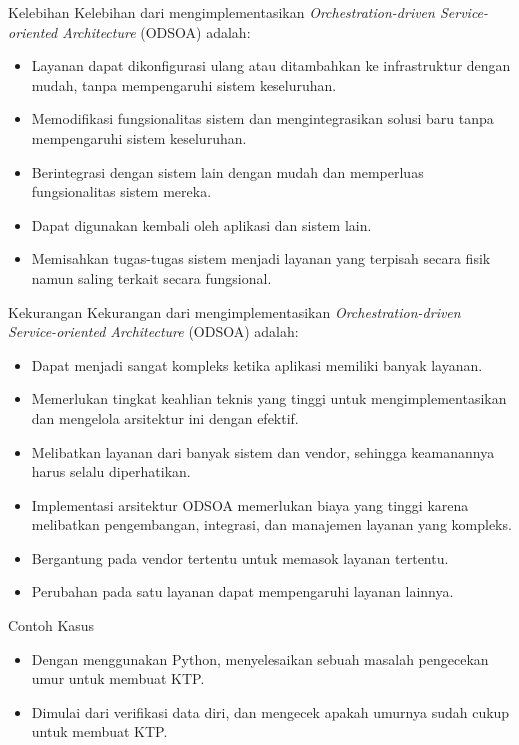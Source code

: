 \documentclass{beamer}
\begin{document}
	\begin{frame}{Kelebihan}
		Kelebihan dari mengimplementasikan \textit{Orchestration-driven Service-oriented Architecture} (ODSOA) adalah:
		\begin{itemize}
			\item Layanan dapat dikonfigurasi ulang atau ditambahkan ke infrastruktur dengan mudah, tanpa mempengaruhi sistem keseluruhan.
			\item Memodifikasi fungsionalitas sistem dan mengintegrasikan solusi baru tanpa mempengaruhi sistem keseluruhan.
			\item Berintegrasi dengan sistem lain dengan mudah dan memperluas fungsionalitas sistem mereka.
			\item Dapat digunakan kembali oleh aplikasi dan sistem lain.
			\item Memisahkan tugas-tugas sistem menjadi layanan yang terpisah secara fisik namun saling terkait secara fungsional.
			
		\end{itemize}
	\end{frame}
	
	\begin{frame}{Kekurangan}
		Kekurangan dari mengimplementasikan \textit{Orchestration-driven Service-oriented Architecture} (ODSOA) adalah:
		\begin{itemize}
			\item Dapat menjadi sangat kompleks ketika aplikasi memiliki banyak layanan.
			\item Memerlukan tingkat keahlian teknis yang tinggi untuk mengimplementasikan dan mengelola arsitektur ini dengan efektif.
			\item Melibatkan layanan dari banyak sistem dan vendor, sehingga keamanannya harus selalu diperhatikan.
			\item Implementasi arsitektur ODSOA memerlukan biaya yang tinggi karena melibatkan pengembangan, integrasi, dan manajemen layanan yang kompleks.
			\item Bergantung pada vendor tertentu untuk memasok layanan tertentu.
			\item Perubahan pada satu layanan dapat mempengaruhi layanan lainnya.
		\end{itemize}
	\end{frame}
	
	\begin{frame}{Contoh Kasus}
		\begin{itemize}
			\item Dengan menggunakan Python, menyelesaikan sebuah masalah pengecekan umur untuk membuat KTP.
			\item Dimulai dari verifikasi data diri, dan mengecek apakah umurnya sudah cukup untuk membuat KTP.
		\end{itemize}
	\end{frame}
	
\end{document}
